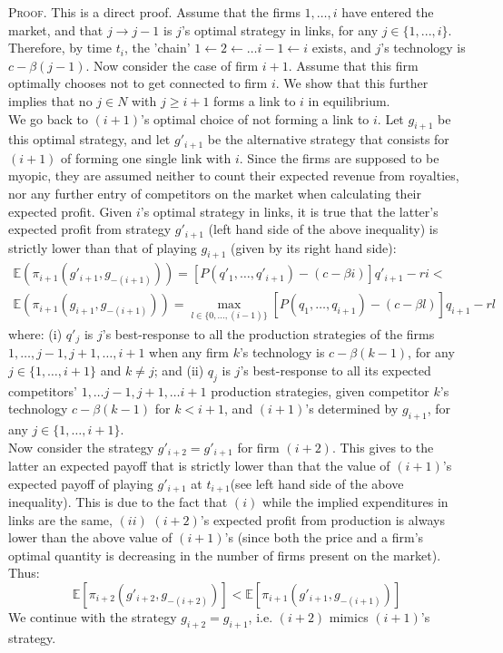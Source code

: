 \documentclass[11pt]{article}
\begin{document}
\indent \textsc{Proof.} This is a direct proof. Assume that the firms $1, \ldots , i$ have entered the market, and that $j \rightarrow j-1$ is $j$'s optimal strategy in links, for any $j\in \{1,...,i\}$. Therefore, by time $t_{i}$, the 'chain'  $1 \leftarrow 2 \leftarrow \ldots i-1 \leftarrow i$ exists, and $j$'s technology is $c-\beta (j-1)$. Now consider the case of firm $i+1$. Assume that this firm optimally chooses not to get connected to firm $i$. We show that this further implies that no $j\in N$ with $j\geq i+1$ forms a link to $i$ in equilibrium. \\
\indent We go back to $(i+1)$'s optimal choice of not forming a link to $i$. Let $g_{i+1}$ be this optimal strategy, and let $g'_{i+1}$ be the alternative strategy that consists for $(i+1)$ of forming one single link with $i$. Since the firms are supposed to be myopic, they are assumed neither to count their expected revenue from royalties, nor any further entry of competitors on the market when calculating their expected profit. Given $i$'s optimal strategy in links, it is true that the latter's expected profit from strategy $g'_{i+1}$ (left hand side of the above inequality) is strictly lower than that of playing $g_{i+1}$ (given by its right hand side):
\begin{multline*}
\mathbb{E}(\pi_{i+1}(g'_{i+1}, g_{-(i+1)}))=[P(q'_1, \ldots , q'_{i+1})- (c-\beta i)]q'_{i+1} -r i  <\\
 \mathbb{E}(\pi_{i+1}(g_{i+1}, g_{-(i+1)}))=
\max \limits_{l\in \{0,...,(i-1)\}} [P(q_1, \ldots, q_{i+1})- (c-\beta l)]q_{i+1} - r l
\end{multline*}
where: (i) $q'_j$ is $j$'s best-response to all the production strategies of the firms $1,\ldots, j-1, j+1, \ldots,  i+1$ when any firm $k$'s technology is $c-\beta (k-1)$, for any $j\in \{1,\ldots, i+1\}$ and $k\neq j$; and (ii) $q_j$ is $j$'s best-response to all its expected competitors' $1,\ldots j-1, j+1, \ldots i+1$ production strategies, given competitor $k$'s technology $c-\beta(k-1)$ for $k<i+1$, and $(i+1)$'s determined by $g_{i+1}$, for any $j\in \{1,\ldots , i+1\}$. \\
\indent Now consider the strategy $g'_{i+2}=g'_{i+1}$ for firm $(i+2)$. This gives to the latter an expected payoff that is strictly lower than that the value of $(i+1)$'s expected payoff of playing $g'_{i+1}$ at $t_{i+1}$(see left hand side of the above inequality). This is due to the fact that $(i)$ while the implied expenditures in links are the same, $(ii)$ $(i+2)$'s expected profit from production is always lower than the above value of $(i+1)$'s (since both the price and a firm's optimal quantity is decreasing in the number of firms present on the market). Thus: 
\begin{equation*}
\mathbb{E} [\pi_{i+2}(g'_{i+2}, g_{-(i+2)}) ] < \mathbb{E}[\pi_{i+1}(g'_{i+1}, g_{-(i+1)}) ]
\end{equation*}
\indent We continue with the strategy $g_{i+2}=g_{i+1}$, i.e. $(i+2)$ mimics $(i+1)$'s strategy.  
\end{document}
